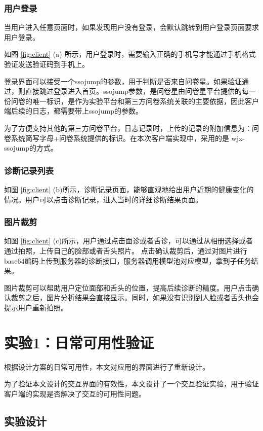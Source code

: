 \subsubsection{用户登录}

当用户进入任意页面时，如果发现用户没有登录，会默认跳转到用户登录页面要求用户登录。

如图 \ref{fig:client} (a) 所示，用户登录时，需要输入正确的手机号才能通过手机格式验证发送验证码到手机上。

登录界面可以接受一个ssojump的参数，用于判断是否来自问卷星。如果验证通过，则直接跳过登录进入首页。ssojump参数，是问卷星由问卷星平台提供的每一份问卷的唯一标识，是作为实验平台和第三方问卷系统关联的主要依据，因此客户端后续的日志，都需要带上ssojump的参数。

为了方便支持其他的第三方问卷平台，日志记录时，上传的记录的附加信息为：问卷系统简写字母+问卷系统提供的标识。在本次客户端实现中，采用的是 wjx-ssojump的方式。

\subsubsection{诊断记录列表}

如图 \ref{fig:client} (b)所示，诊断记录页面，能够直观地给出用户近期的健康变化的情况。用户可以点击诊断记录，进入当时的详细诊断结果页面。

\subsubsection{图片裁剪}

如图 \ref{fig:client} (c)所示，用户通过点击面诊或者舌诊，可以通过从相册选择或者通过拍照，上传自己的脸部或者舌头照片。
点击确认裁剪后，通过对图片进行base64编码上传到服务器的诊断接口，服务器调用模型池对应模型，拿到子任务结果。

图片裁剪可以帮助用户定位面部和舌头的位置，提高后续诊断的精度。用户点击确认裁剪之后，图片分析结果会直接显示。同时，如果没有识别到人脸或者舌头也会提示用户重新拍照。


\section{实验1：日常可用性验证}

根据设计方案的日常可用性，本文对应用的界面进行了重新设计。

为了验证本文设计的交互界面的有效性，本文设计了一个交互验证实验，用于验证客户端的实现是否解决了交互的可用性问题。

\subsection{实验设计}

